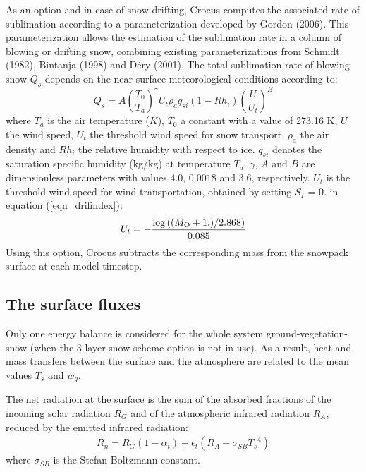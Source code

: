 As an option and in case of snow drifting, Crocus computes the
associated rate of sublimation according to a parameterization
developed by Gordon \etal (2006)\nocite{Gordon2006}. This
parameterization allows the estimation of the sublimation rate in a
column of blowing or drifting snow, combining existing
parameterizations from Schmidt \etal (1982)\nocite{schmidt1982},
Bintanja \etal (1998)\nocite{bintanja1995} and  D\'{e}ry \etal
(2001)\nocite{dery2002}. The total sublimation rate of blowing snow
$Q_s$ depends on the near-surface meteorological conditions according
to: 
%
\begin{equation}
Q_s=A(\frac{T_0}{T_a})^\gamma U_t\rho_aq_{si}(1-Rh_i)(\frac{U}{U_t})^B
\end{equation}
where $T_a$ is the air temperature ($K$), $T_0$ a constant with a
value of 273.16 K, $U$ the wind speed, $U_t$ the threshold wind speed
for snow transport, $\rho_a$ the air density and $Rh_i$ the relative
humidity with respect to ice. $q_{si}$ denotes the saturation specific
humidity (kg/kg) at temperature $T_a$. $\gamma$, $A$ and $B$ are
dimensionless parameters with values $4.0$, $0.0018$ and $3.6$,
respectively. $U_t$ is the threshold wind speed for wind
transportation, obtained by setting $S_I$ = 0. in equation
(\ref{eqn_drifindex}):
%
\begin{equation}
U_t = -\frac{\log\left((M_{\rm O}+1.)/2.868 \right)}{0.085}
\end{equation}
Using this option, Crocus subtracts the corresponding mass from the snowpack surface at each model timestep.

\subsection{The surface fluxes}

Only one energy balance is considered for the whole system
ground-vegetation-snow (when the 3-layer snow scheme option is not in use).
As a result, heat and mass transfers between the surface and
the atmosphere are related to the mean values $T_s$ and $w_g$.

The net radiation at the surface is the sum of the absorbed
fractions of the incoming solar radiation $R_G$ and of the
atmospheric infrared radiation $R_A$, reduced by the emitted
infrared radiation:
\begin{eqnarray} \label{eqnRN}
R_n = R_G (1-\alpha_t) + \epsilon_t \left( R_A-\sigma_{SB}{T_s}^4 \right)
\end{eqnarray}
where $\sigma_{SB}$ is the Stefan-Boltzmann constant.

